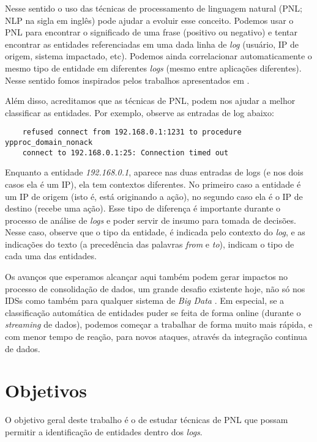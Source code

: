 \documentclass[
	12pt,				%
	openright,			%
	twoside,			%
	a4paper,			%
	english,			%
	spanish,			%
	brazil,				%
	]{abntex2}
\begin{document}
Nesse sentido o uso das técnicas de processamento de linguagem natural (PNL; NLP na sigla em inglês) pode ajudar a evoluir esse conceito. Podemos usar o PNL para encontrar o significado de uma frase (positivo ou negativo) e tentar encontrar as entidades referenciadas em uma dada linha de \emph{log} (usuário, IP de origem, sistema impactado, etc). Podemos ainda correlacionar automaticamente o mesmo tipo de entidade em diferentes \emph{logs} (mesmo entre aplicações diferentes).  Nesse sentido fomos inspirados pelos trabalhos apresentados em \cite{matos2010environment, duque2012processo}.

Além disso, acreditamos que as técnicas de PNL, podem nos ajudar a melhor classificar as entidades. Por exemplo, observe as entradas de log abaixo:

{\tiny
	\begin{verbatim}
	refused connect from 192.168.0.1:1231 to procedure ypproc_domain_nonack 
	connect to 192.168.0.1:25: Connection timed out
	\end{verbatim}
}

Enquanto a entidade \emph{192.168.0.1}, aparece nas duas entradas de logs (e nos dois casos ela é um IP), ela tem contextos diferentes. No primeiro caso a entidade é um IP de origem (isto é, está originando a ação), no segundo caso ela é o IP de destino (recebe uma ação). Esse tipo de diferença é importante durante o processo de análise de \emph{logs} e poder servir de insumo para tomada de decisões. Nesse caso, observe que o tipo da entidade, é indicada pelo contexto do \emph{log}, e as indicações do texto (a precedência das palavras \emph{from} e \emph{to}), indicam o tipo de cada uma das entidades.

Os avanços que esperamos alcançar aqui também podem gerar impactos no processo de consolidação de dados, um grande desafio existente hoje, não só nos IDSs como também para qualquer sistema de \emph{Big Data} \cite{zuech2015intrusion}. Em especial, se a classificação automática de entidades puder se feita de forma online (durante o  \emph{streaming} de dados), podemos começar a trabalhar de forma muito mais rápida, e com menor tempo de reação, para novos ataques, através da integração continua de dados.


\section{Objetivos}
O objetivo geral deste trabalho é o de estudar técnicas de PNL que possam permitir a identificação de entidades dentro dos \emph{logs}.
\end{document}
